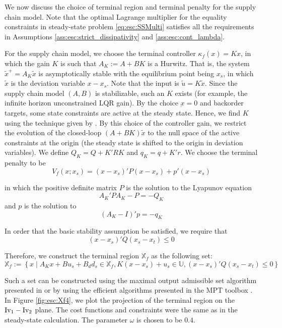We now discuss the choice of terminal region and terminal penalty for
the supply chain model. Note that the optimal Lagrange multiplier for
the equality constraints in steady-state problem \eqref{eq:esc:SSMulti}
satisfies all the requirements in Assumptions
\ref{ass:esc:strict_dissipativity} and \ref{ass:esc:cont_lambda}. 

For the supply chain model, we choose the terminal controller
$\kappa_f(x) = Kx$, in which the gain $K$ is such that $A_K :=A+BK$ is
a Hurwitz. That is, the system $\tilde{x}^+ = A_K\tilde{x}$ is
asymptotically stable with the equilibrium point being $x_s$, in
which $\tilde{x}$ is the deviation variable $x-x_s$. Note that the
input is $\tilde{u} = K\tilde{x}$.  Since the supply
chain model $(A,B)$ is stabilizable, such an $K$ exists (for example,
the infinite horizon unconstrained LQR gain). By the choice
$\underbar{x} = 0$  and backorder targets, some state constraints are
active at the steady state. Hence,  we find $K$ using the technique given by
\citet{rao:rawlings:1999}. By this choice of the controller gain, we
restrict the evolution of the closed-loop $(A+BK)\tilde{x}$ to the
null space of the active constraints at the origin (the steady state
is shifted to the origin in deviation variables). We define $Q_K = Q+K'RK$
and $q_K = q+K'r$. We choose the terminal penalty to be 
\begin{equation}
\label{eq:esc:Vf}
V_f(x;x_s) = (x-x_s)'P(x-x_s)+ p'(x-x_s)
\end{equation}

in which the positive definite matrix $P$ is the solution to the
Lyapunov equation
\[ A_K'PA_K-P = -Q_K \]
and $p$ is the solution to 
\[ (A_K-I)'p = -q_K \]

In order that the basic stability assumption be satisfied, we require
that  
\begin{equation}
\label{eq:esc:BSA_condition}
(x-x_s)'Q(x_s-x_t)  \leq 0
\end{equation}


Therefore, we construct the terminal region $\mathbb{X}_f$ as the
following set:
\begin{equation}
\label{eq:esc:Xf}
\mathbb{X}_f := \left \lbrace x \mid A_Kx+Bu_s+B_dd_s \in
  \mathbb{X}_f,  K(x-x_s)+u_s \in \mathbb{U}, (x-x_s)'Q(x_s-x_t) \leq 0\right \rbrace
\end{equation}

Such a set can be constructed using the maximal output admissible set
algorithm presented in \citet{gilbert:tan:1991} or by using the
efficient algorithms presented in the MPT toolbox
\citep{kvasnica:grieder:baotic:2006}. In Figure \ref{fig:esc:Xf4}, we plot
the projection of the terminal region on the $\textrm{Iv}_1-\textrm{Iv}_2$
plane. The cost functions and constraints were the same as in the
steady-state calculation. The parameter $\omega$ is chosen to be
$0.4$.

